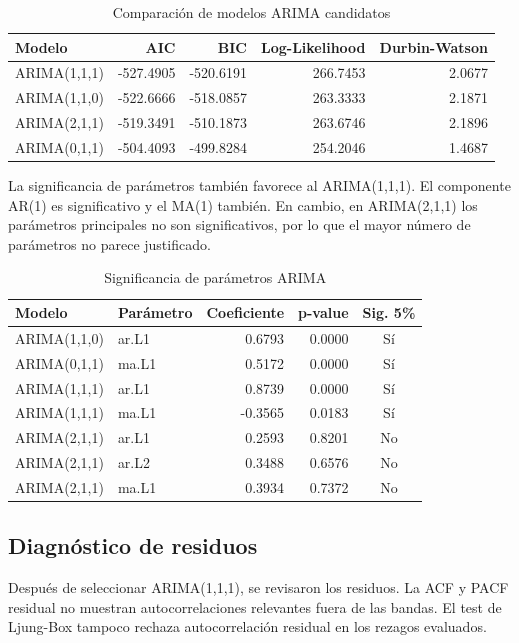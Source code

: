 \documentclass[11pt,a4paper]{article}
\begin{document}
\begin{table}[H]
\centering
\caption{Comparación de modelos ARIMA candidatos}
\begin{tabular}{lrrrr}
\toprule
Modelo & AIC & BIC & Log-Likelihood & Durbin-Watson \\
\midrule
ARIMA(1,1,1) & -527.4905 & -520.6191 & 266.7453 & 2.0677 \\
ARIMA(1,1,0) & -522.6666 & -518.0857 & 263.3333 & 2.1871 \\
ARIMA(2,1,1) & -519.3491 & -510.1873 & 263.6746 & 2.1896 \\
ARIMA(0,1,1) & -504.4093 & -499.8284 & 254.2046 & 1.4687 \\
\bottomrule
\end{tabular}
\end{table}

La significancia de parámetros también favorece al ARIMA(1,1,1). El componente AR(1) es significativo y el MA(1) también. En cambio, en ARIMA(2,1,1) los parámetros principales no son significativos, por lo que el mayor número de parámetros no parece justificado.

\begin{table}[H]
\centering
\caption{Significancia de parámetros ARIMA}
\begin{tabular}{llrrc}
\toprule
Modelo & Parámetro & Coeficiente & p-value & Sig. 5\% \\
\midrule
ARIMA(1,1,0) & ar.L1 & 0.6793 & 0.0000 & Sí \\
ARIMA(0,1,1) & ma.L1 & 0.5172 & 0.0000 & Sí \\
ARIMA(1,1,1) & ar.L1 & 0.8739 & 0.0000 & Sí \\
ARIMA(1,1,1) & ma.L1 & -0.3565 & 0.0183 & Sí \\
ARIMA(2,1,1) & ar.L1 & 0.2593 & 0.8201 & No \\
ARIMA(2,1,1) & ar.L2 & 0.3488 & 0.6576 & No \\
ARIMA(2,1,1) & ma.L1 & 0.3934 & 0.7372 & No \\
\bottomrule
\end{tabular}
\end{table}

\subsection{Diagnóstico de residuos}

Después de seleccionar ARIMA(1,1,1), se revisaron los residuos. La ACF y PACF residual no muestran autocorrelaciones relevantes fuera de las bandas. El test de Ljung-Box tampoco rechaza autocorrelación residual en los rezagos evaluados.
\end{document}
